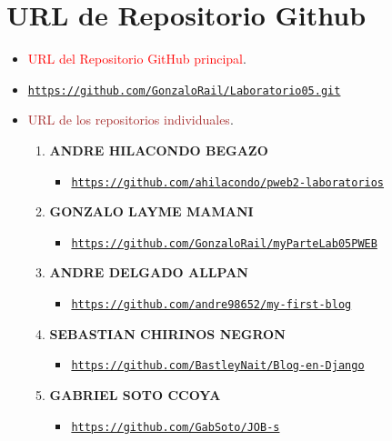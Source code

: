 \documentclass{article}
\begin{document}
	\section{URL de Repositorio Github}
	\begin{itemize}
		\item \textcolor{red}{URL del Repositorio GitHub principal}.
		\item \href{https://github.com/GonzaloRail/Laoboratorio_05_PWEB.git}{\color{blue}\texttt{https://github.com/GonzaloRail/Laboratorio05.git}}
		\item \textcolor{brown}{URL de los repositorios individuales}.
        \begin{enumerate}
        \item \textbf{ANDRE HILACONDO BEGAZO}
        \begin{itemize}
            \item \href{https://github.com/ahilacondo/pweb2-laboratorios/tree/main/lab05}{\color{blue}\texttt{https://github.com/ahilacondo/pweb2-laboratorios}}
        \end{itemize}
        \item \textbf{GONZALO LAYME MAMANI}
         \begin{itemize}
            \item \href{https://github.com/GonzaloRail/myParteLab05PWEB}{\color{blue}\texttt{https://github.com/GonzaloRail/myParteLab05PWEB}}
        \end{itemize}
        \item \textbf{ANDRE DELGADO ALLPAN}
        \begin{itemize}
            \item \href{https://github.com/andre98652/my-first-blog}{\color{blue}\texttt{https://github.com/andre98652/my-first-blog}}
        \end{itemize}
        \item \textbf{SEBASTIAN CHIRINOS NEGRON}
        \begin{itemize}
            \item \href{https://github.com/BastleyNait/Blog-en-Django}{\color{blue}\texttt{https://github.com/BastleyNait/Blog-en-Django}}
        \end{itemize}
        \item \textbf{GABRIEL SOTO CCOYA}
        \begin{itemize}
            \item \href{https://github.com/GabSoto/JOB-s}{\color{blue}\texttt{https://github.com/GabSoto/JOB-s}}
        \end{itemize}
        \end{enumerate}
	\end{itemize}
 
\end{document}
